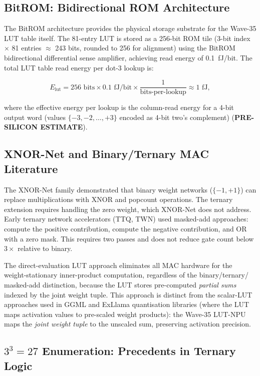 \subsection{BitROM: Bidirectional ROM Architecture}

The BitROM architecture \cite{bitrom_2025} provides the physical storage
substrate for the Wave-35 LUT table itself.  The 81-entry LUT is stored as a
256-bit ROM tile (3-bit index $\times$ 81 entries $\approx$ 243 bits, rounded
to 256 for alignment) using the BitROM bidirectional differential sense
amplifier, achieving read energy of 0.1~fJ/bit.  The total LUT table read
energy per dot-3 lookup is:

\[
  E_{\mathrm{lut}} = 256\text{ bits} \times 0.1\text{ fJ/bit} \times
  \frac{1}{\text{bits-per-lookup}} \approx 1\text{ fJ},
\]

\noindent where the effective energy per lookup is the column-read energy for
a 4-bit output word (values $\{-3, -2, \ldots, +3\}$ encoded as 4-bit two's
complement) (\textbf{PRE-SILICON ESTIMATE}).

\subsection{XNOR-Net and Binary/Ternary MAC Literature}

The XNOR-Net family \cite{bitnet_b158_2024} demonstrated that binary weight
networks ($\{-1, +1\}$) can replace multiplications with XNOR and popcount
operations.  The ternary extension requires handling the zero weight, which
XNOR-Net does not address.  Early ternary network accelerators (TTQ, TWN)
used masked-add approaches: compute the positive contribution, compute the
negative contribution, and OR with a zero mask.  This requires two passes and
does not reduce gate count below $3\times$ relative to binary.

The direct-evaluation LUT approach eliminates all MAC hardware for the
weight-stationary inner-product computation, regardless of the binary/ternary/
masked-add distinction, because the LUT stores pre-computed \emph{partial sums}
indexed by the joint weight tuple.  This approach is distinct from the
scalar-LUT approaches used in GGML and ExLlama quantisation libraries (where
the LUT maps activation values to pre-scaled weight products): the Wave-35
LUT-NPU maps the \emph{joint weight tuple} to the unscaled sum, preserving
activation precision.

\subsection{$3^3 = 27$ Enumeration: Precedents in Ternary Logic}

